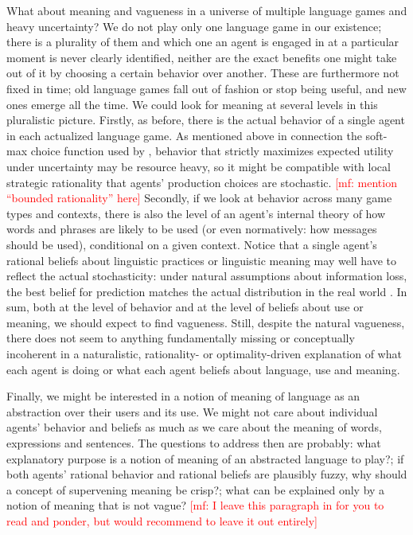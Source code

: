 \documentclass[a4paper]{article}
\newcommand{\mf}[1]{\textcolor{Red}{[mf: #1]}}
\begin{document}
What about meaning and vagueness in a universe of multiple language games and heavy uncertainty?
We do not play only one language game in our existence; there is a plurality of them and which one an agent is engaged in at a particular moment is never clearly identified, neither are the exact benefits one might take out of it by choosing a certain behavior over another.
These are furthermore not fixed in time; old language games fall out of fashion or stop being useful, and new ones emerge all the time. 
We could look for meaning at several levels in this pluralistic picture. 
Firstly, as before, there is the actual behavior of a single agent in each actualized language game. 
As mentioned above in connection the soft-max choice function used by \textcite{franke_vagueness_2011}, behavior that strictly maximizes expected utility under uncertainty may be resource heavy, so it might be compatible with local strategic rationality that agents' production choices are stochastic. 
\mf{mention ``bounded rationality'' here}
Secondly, if we look at behavior across many game types and contexts, there is also the level of an agent's internal theory of how words and phrases are likely to be used (or even normatively: how messages should be used), conditional on a given context. 
Notice that a single agent's rational beliefs about linguistic practices or linguistic meaning may well have to reflect the actual stochasticity: under natural assumptions about information loss, the best belief for prediction matches the actual distribution in the real world \parencite[\emph{e.g.}][]{VehtariOjanen2012:A-survey-of-Bay}.
In sum, both at the level of behavior and at the level of beliefs about use or meaning, we should expect to find vagueness.
Still, despite the natural vagueness, there does not seem to anything fundamentally missing or conceptually incoherent in a naturalistic, rationality- or optimality-driven explanation of what each agent is doing or what each agent beliefs about language, use and meaning. 

Finally, we might be interested in a notion of meaning of language as an abstraction over their users and its use.
We might not care about individual agents' behavior and beliefs as much as we care about the meaning of words, expressions and sentences.
The questions to address then are probably: what explanatory purpose is a notion of meaning of an abstracted language to play?; if both agents' rational behavior and rational beliefs are plausibly fuzzy, why should a concept of supervening meaning be crisp?; what can be explained only by a notion of meaning that is not vague?
\mf{I leave this paragraph in for you to read and ponder, but would recommend to leave it out entirely}
\end{document}
